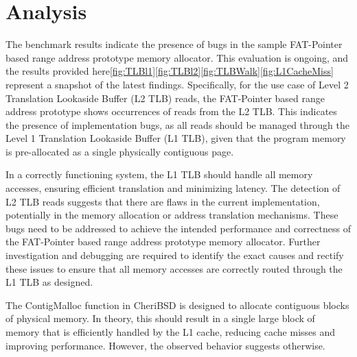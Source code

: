 
\section{Analysis}

The benchmark results indicate the presence of bugs in the sample FAT-Pointer based range address prototype memory allocator. This evaluation is ongoing, and the 
results provided here\ref{fig:TLBl1}\ref{fig:TLBl2}\ref{fig:TLBWalk}\ref{fig:L1CacheMiss} represent a snapshot of the latest findings. Specifically, for the use case of Level 2 Translation Lookaside Buffer (L2 TLB) reads, 
the FAT-Pointer based range address prototype shows occurrences of reads from the L2 TLB. This indicates the presence of implementation bugs, 
as all reads should be managed through the Level 1 Translation Lookaside Buffer (L1 TLB), given that the program memory is pre-allocated as a single 
physically contiguous page.
\newline

In a correctly functioning system, the L1 TLB should handle all memory accesses, ensuring efficient translation and minimizing latency. 
The detection of L2 TLB reads suggests that there are flaws in the current implementation, potentially in the memory allocation or 
address translation mechanisms. These bugs need to be addressed to achieve the intended performance and correctness of the 
FAT-Pointer based range address prototype memory allocator. Further investigation and debugging are required to 
identify the exact causes and rectify these issues to ensure that all memory accesses are correctly routed 
through the L1 TLB as designed.
\newline

The ContigMalloc function in CheriBSD is designed to allocate contiguous blocks of physical memory. In theory, this should result in a single large block of memory 
that is efficiently handled by the L1 cache, reducing cache misses and improving performance. However, the observed behavior suggests otherwise.
\newline

